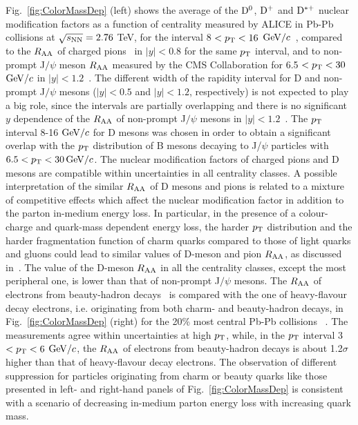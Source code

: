 Fig.~\ref{fig:ColorMassDep} (left) shows the average of the ${\rm D^0}$, ${\rm D^+}$ and ${\rm D^{*+}}$ 
nuclear modification factors as a function of centrality measured by ALICE in
Pb-Pb collisions at $\sqrt{s_{\rm NN}} =  2.76$ TeV, for the interval 8 $< p_{\rm T} < 16$ $\mathrm{GeV}/c$~\cite{Adam:2015nna}, 
compared to the $R_{\rm AA}$ of charged pions~\cite{Abelev:2014laa} in $|y| < 0.8$ for the same $p_{\rm T}$ interval, 
and to non-prompt J$/\psi$ meson $R_{\rm AA}$ measured by the CMS Collaboration for 6.5 $< p_{\rm T} < 30$ $\mathrm{GeV}/c$ 
in $|y| < 1.2$~\cite{Khachatryan:2016ypw}. The different width of the rapidity interval for D and non-prompt
J$/\psi$ mesons ($|y| < 0.5$ and $|y| < 1.2$, respectively) is not expected to play a big role, since
the intervals are partially overlapping and there is no significant $y$ dependence of the $R_{\rm AA}$ of 
non-prompt J$/\psi$ mesons in $|y| < 1.2$~\cite{Khachatryan:2016ypw}. 
The $p_{\rm T}$ interval 8-16 $\mathrm{GeV}/c$ for D mesons was chosen 
in order to obtain a significant overlap with the $p_{\rm T}$ distribution 
of B mesons decaying to J/$\psi$ particles with $6.5 < p_{\rm T} < 30\, \mathrm{GeV}/c$.
The nuclear modification 
factors of charged pions and D mesons are compatible within uncertainties
in all centrality classes. A possible interpretation of the similar $R_{\rm AA}$ of D mesons and pions is 
related to a mixture of competitive effects which affect the nuclear modification
factor in addition to the parton in-medium energy loss. In particular,
in the presence of a colour-charge and quark-mass dependent 
energy loss, the harder $p_{\rm T}$ distribution and the harder fragmentation function of 
charm quarks compared to those of light quarks and gluons could lead to similar 
values of D-meson and pion $R_{\rm AA}$, as discussed in~\cite{Djordjevic:2013pba}. 
The value of the D-meson $R_{\rm AA}$ in all the centrality
classes, except the most peripheral one, is lower than that of non-prompt J$/\psi$ mesons. 
The $R_{\rm AA}$ of electrons from beauty-hadron decays~\cite{Adam:2016wyz} 
is compared with the one of heavy-flavour decay electrons, i.e. originating from both charm- and
beauty-hadron decays, in Fig.~\ref{fig:ColorMassDep} (right) 
for the 20\% most central Pb-Pb collisions
~\cite{Adam:2016khe}. The measurements agree within 
uncertainties at high $p_{\rm T}$, while, in the $p_{\rm T}$ 
interval 3 $< p_{\rm T} < 6$ $\mathrm{GeV}/c$, the $R_{\rm AA}$ 
of electrons from beauty-hadron decays 
is about 1.2$\sigma$ higher than that of heavy-flavour decay 
electrons. The observation of different 
suppression for particles originating from
charm or beauty quarks like those presented in left- and 
right-hand panels of Fig.~\ref{fig:ColorMassDep} 
is consistent with a scenario of decreasing in-medium 
parton energy loss with increasing quark mass.

